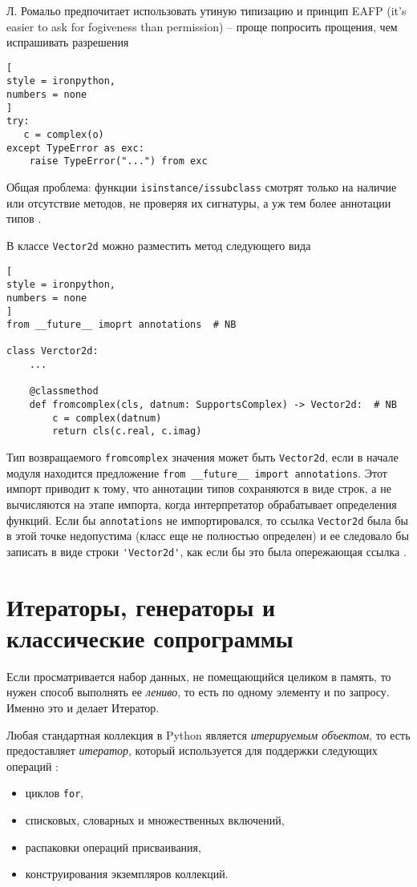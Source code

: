 \documentclass[%
	11pt,
	a4paper,
	utf8,
		]{article}
\begin{document}
Л. Ромальо предпочитает использовать утиную типизацию и принцип EAFP (it's easier to ask for fogiveness than permission) -- проще попросить прощения, чем испрашивать разрешения
\begin{lstlisting}[
style = ironpython,
numbers = none
]
try:
   c = complex(o)
except TypeError as exc:
    raise TypeError("...") from exc
\end{lstlisting}

Общая проблема: функции \verb|isinstance/issubclass| смотрят только на наличие или отсутствие методов, не проверяя их сигнатуры, а уж тем более аннотации типов \cite[]{ramalho:python-2022}.

В классе \verb*|Vector2d| можно разместить метод следующего вида
\begin{lstlisting}[
style = ironpython,
numbers = none
]
from __future__ imoprt annotations  # NB

class Verctor2d:
    ...
    
    @classmethod
    def fromcomplex(cls, datnum: SupportsComplex) -> Vector2d:  # NB
        c = complex(datnum)
        return cls(c.real, c.imag)
\end{lstlisting}

Тип возвращаемого \verb|fromcomplex| значения может быть \verb*|Vector2d|, если в начале модуля находится предложение \verb|from __future__ import annotations|. Этот импорт приводит к тому, что аннотации типов сохраняются в виде строк, а не вычисляются на этапе импорта, когда интерпретатор обрабатывает определения функций. Если бы \verb|annotations| не импортировался, то ссылка \verb*|Vector2d| была бы в этой точке недопустима (класс еще не полностью определен) и ее следовало бы записать в виде строки \verb*|'Vector2d'|, как если бы это была опережающая ссылка \cite[]{ramalho:python-2022}.

\section{Итераторы, генераторы и классические сопрограммы}

Если просматривается набор данных, не помещающийся целиком в память, то нужен способ выполнять ее \emph{лениво}, то есть по одному элементу и по запросу. Именно это и делает Итератор. 

Любая стандартная коллекция в Python является \emph{итерируемым объектом}, то есть предоставляет \emph{итератор}, который используется для поддержки следующих операций \cite[]{ramalho:python-2022}:
\begin{itemize}
	\item циклов \verb|for|,
	
	\item списковых, словарных и множественных включений, 
	
	\item распаковки операций присваивания,
	
	\item конструирования экземпляров коллекций.
\end{itemize}
\end{document}
